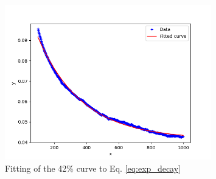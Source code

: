 \documentclass{article}
\begin{document}
\begin{figure}[htbp]
    \centering
    \includegraphics[width=0.8\textwidth]{res/fit.png}
    \caption{Fitting of the 42\% curve to Eq. \ref*{eq:exp_decay}}
    \label{fig:decay_fit}
\end{figure}







\end{document}
